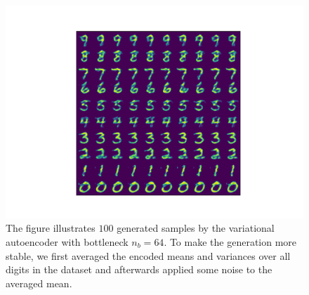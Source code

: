 \begin{figure}
\begin{center}
   \begin{minipage}[b]{0.60\linewidth}
      \includegraphics[trim = 15mm 10mm 15mm 10mm, clip, width=\linewidth]{convolutional_VAE_snd_KL_4e-5_10k_epochs_64D_generated_optimal}
	\end{minipage}
\end{center}
\caption{The figure illustrates $100$ generated samples by the variational autoencoder with bottleneck $n_b=64$. To make the generation more stable, we first averaged the encoded means and variances over all digits in the dataset and afterwards applied some noise to the averaged mean.}\label{fig:convolutional_VAE_better_generations}
\end{figure}


